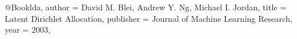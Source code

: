\documentclass[german,version-2020-11]{uzl-thesis}
\begin{document}
\begin{itemize}
% 
%
%
%
% 
% 
%
%
%
%
% 
% 
%
%
%
%
%
%
%


%

\begin{bibtex-entries}

@Book{lda,
  author =       {David M. Blei, Andrew Y. Ng, Michael I. Jordan},
  title =        {Latent Dirichlet Allocation},
  publisher =    {Journal of Machine Learning Research},
  year =         {2003},
}


\end{bibtex-entries}
\end{itemize}
\end{document}

